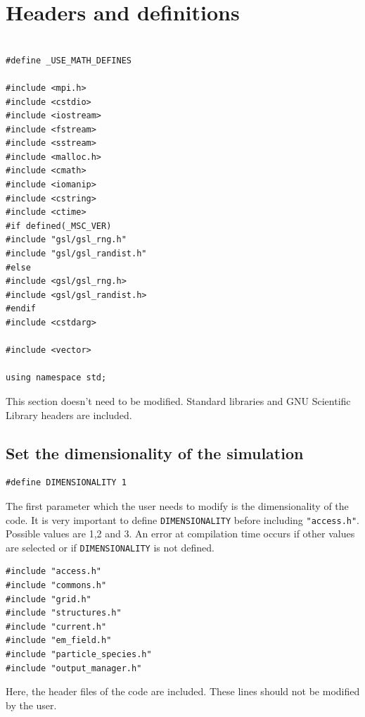 \documentclass[11pt,a4paper]{report}
\begin{document}
\section{Headers and definitions}
\begin{lstlisting}[backgroundcolor=\color{no_modify}]

#define _USE_MATH_DEFINES

#include <mpi.h>
#include <cstdio>
#include <iostream>
#include <fstream>
#include <sstream>
#include <malloc.h>
#include <cmath>
#include <iomanip>
#include <cstring>
#include <ctime>    
#if defined(_MSC_VER)
#include "gsl/gsl_rng.h" 
#include "gsl/gsl_randist.h"
#else
#include <gsl/gsl_rng.h> 
#include <gsl/gsl_randist.h>
#endif
#include <cstdarg> 

#include <vector>

using namespace std;
\end{lstlisting}
This section doesn't need to be modified. Standard libraries and GNU Scientific Library headers are included.\\

\subsection*{Set the dimensionality of the simulation}
\begin{lstlisting}
#define DIMENSIONALITY 1
\end{lstlisting}
The first parameter which the user needs to modify is the dimensionality of the code. It is very important to define \verb+DIMENSIONALITY+ before including \verb+"access.h"+. Possible values are 1,2 and 3. An error at compilation time occurs if other values are selected or if \verb+DIMENSIONALITY+ is not defined.
\begin{lstlisting}[backgroundcolor=\color{no_modify}]
#include "access.h"
#include "commons.h"
#include "grid.h"
#include "structures.h"
#include "current.h"
#include "em_field.h"
#include "particle_species.h"
#include "output_manager.h"
\end{lstlisting}
Here, the header files of the code are included. These lines should not be modified by the user.\\
\end{document}
